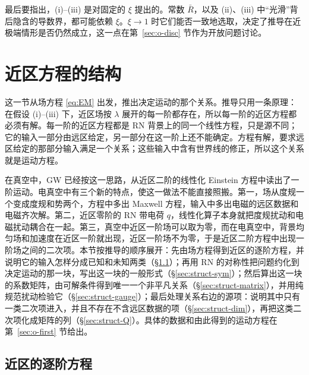 \documentclass[11pt,a4paper]{ctexart}
\begin{document}
最后要指出，(i)--(iii) 是对固定的 $\xi$ 提出的。常数 $\bar R$，以及 (ii)、(iii) 中“光滑”背后隐含的导数界，都可能依赖 $\xi$。$\xi\to1$ 时它们能否一致地选取，决定了推导在近极端情形是否仍然成立，这一点在第~\ref{sec:o-disc} 节作为开放问题讨论。

\section{近区方程的结构}\label{sec:o-structure}

这一节从场方程 \eqref{eq:EM} 出发，推出决定运动的那个关系。推导只用一条原理：在假设 (i)--(iii) 下，近区场按 $\lambda$ 展开的每一阶都存在，所以每一阶的近区方程都必须有解。每一阶的近区方程都是 RN 背景上的同一个线性方程，只是源不同；它的输入一部分由远区给定，另一部分在这一阶上还不能确定。方程有解，要求远区给定的那部分输入满足一个关系；这些输入中含有世界线的修正，所以这个关系就是运动方程。

在真空中，GW 已经按这一思路，从近区二阶的线性化 Einstein 方程中读出了一阶运动。电真空中有三个新的特点，使这一做法不能直接照搬。第一，场从度规一个变成度规和势两个，方程中多出 Maxwell 方程，输入中多出电磁的远区数据和电磁齐次解。第二，近区零阶的 RN 带电荷 $q$，线性化算子本身就把度规扰动和电磁扰动耦合在一起。第三，真空中近区一阶场可以取为零，而在电真空中，背景均匀场和加速度在近区一阶就出现，近区一阶场不为零，于是近区二阶方程中出现一阶场之间的二次项。本节按推导的顺序展开：先由场方程得到近区的逐阶方程，并说明它的输入怎样分成已知和未知两类（\S\ref{sec:struct-hier}）；再用 RN 的对称性把问题约化到决定运动的那一块，写出这一块的一般形式（\S\ref{sec:struct-sym}）；然后算出这一块的系数矩阵，由可解条件得到唯一一个非平凡关系（\S\ref{sec:struct-matrix}），并用纯规范扰动检验它（\S\ref{sec:struct-gauge}）；最后处理关系右边的源项：说明其中只有一类二次项进入，并且不存在不含远区数据的项（\S\ref{sec:struct-dim}），再把这类二次项化成矩阵的列（\S\ref{sec:struct-Q}）。具体的数据和由此得到的运动方程在第~\ref{sec:o-first} 节给出。

\subsection{近区的逐阶方程}\label{sec:struct-hier}
\end{document}
